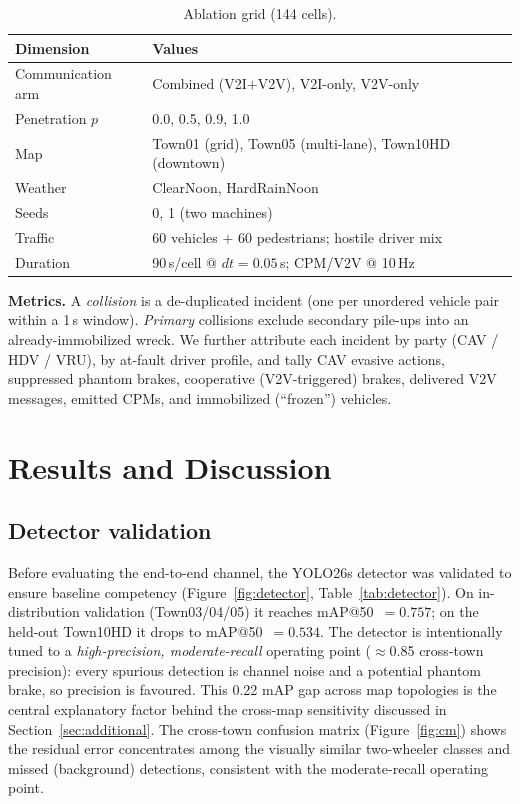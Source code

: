 \documentclass[11pt]{article}
\begin{document}
\begin{table}[t]
  \centering
  \caption{Ablation grid (144 cells).}
  \label{tab:grid}
  \small
  \begin{tabular}{ll}
    \toprule
    Dimension & Values \\
    \midrule
    Communication arm & Combined (V2I$+$V2V), V2I-only, V2V-only \\
    Penetration $p$ & 0.0, 0.5, 0.9, 1.0 \\
    Map & Town01 (grid), Town05 (multi-lane), Town10HD (downtown) \\
    Weather & ClearNoon, HardRainNoon \\
    Seeds & 0, 1 (two machines) \\
    Traffic & 60 vehicles $+$ 60 pedestrians; hostile driver mix \\
    Duration & 90\,s/cell @ $dt=0.05$\,s; CPM/V2V @ 10\,Hz \\
    \bottomrule
  \end{tabular}
\end{table}

\noindent\textbf{Metrics.} A \emph{collision} is a de-duplicated incident (one per
unordered vehicle pair within a 1\,s window). \emph{Primary} collisions exclude
secondary pile-ups into an already-immobilized wreck. We further attribute each
incident by party (CAV / HDV / VRU), by at-fault driver profile, and tally CAV
evasive actions, suppressed phantom brakes, cooperative (V2V-triggered) brakes,
delivered V2V messages, emitted CPMs, and immobilized (``frozen'') vehicles.

\section{Results and Discussion}
\subsection{Detector validation}
Before evaluating the end-to-end channel, the YOLO26s detector was validated to
ensure baseline competency (Figure~\ref{fig:detector}, Table~\ref{tab:detector}).
On in-distribution validation (Town03/04/05) it reaches mAP@50~$=0.757$; on the
held-out Town10HD it drops to mAP@50~$=0.534$. The detector is intentionally tuned
to a \emph{high-precision, moderate-recall} operating point
($\approx$0.85 cross-town precision): every spurious detection is channel noise
and a potential phantom brake, so precision is favoured. This 0.22 mAP gap across
map topologies is the central explanatory factor behind the cross-map sensitivity
discussed in Section~\ref{sec:additional}. The cross-town confusion matrix
(Figure~\ref{fig:cm}) shows the residual error concentrates among the visually
similar two-wheeler classes and missed (background) detections, consistent with the
moderate-recall operating point.
\end{document}
